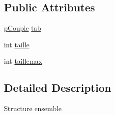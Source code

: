 \subsection*{Public Attributes}
\begin{DoxyCompactItemize}
\item 
\hyperlink{structCouple}{pCouple} \hyperlink{structStrEns_a277698b3d4fd4e80c67a5d2119e71f7d}{tab}
\item 
int \hyperlink{structStrEns_aea990e111124d6bcbe1d5a17e1037854}{taille}
\item 
int \hyperlink{structStrEns_ad5f649f203ec7978215f8093286eca38}{taillemax}
\end{DoxyCompactItemize}


\subsection{Detailed Description}
Structure ensemble 

